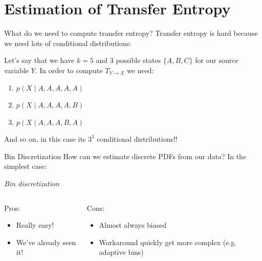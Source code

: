 \documentclass{cubeamer}
\begin{document}
\section{Estimation of Transfer Entropy}

\begin{frame}{What do we need to compute transfer entropy?}
\centering
  Transfer entropy is hard because we need lots of conditional distributions:
    
    Let's say that we have $k=5$ and 3 possible states $\{A, B, C\}$ for our source variable $Y$. In order to compute $T_{Y \rightarrow X}$ we need:
    
    \begin{enumerate}
        \item $p(X \mid A, A, A, A, A)$
        \item $p(X \mid A, A, A, A, B)$
        \item $p(X \mid A, A, A, B, A)$
    \end{enumerate}
    
    And so on, in this case its $3^5$ conditional distributions!!
\end{frame}

\begin{frame}{Bin Discretization}
\centering
    How can we estimate discrete PDFs from our data? In the simplest case:
    
    \textit{Bin discretization}
    
    \vspace{15}
    \begin{columns}
        \begin{column}{0.5\textwidth}
            Pros:
            \begin{itemize}
                \item Really easy!
                \item We've already seen it!
            \end{itemize}
        \end{column}
        \begin{column}{0.5\textwidth}
            Cons:
            \begin{itemize}
                \item Almost always biased
                \item Workaround quickly get more complex (e.g. adaptive bins)
            \end{itemize}
        \end{column}
    \end{columns}
\end{frame}
\end{document}

